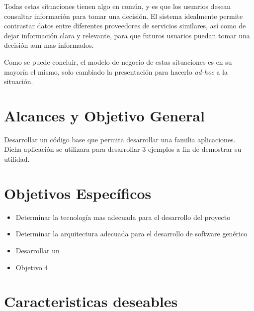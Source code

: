 Todas estas situaciones tienen algo en común, y es que los usuarios desean consultar información para tomar una decisión. El sistema idealmente permite contrastar datos entre diferentes proveedores de servicios similares, así como de dejar información clara y relevante, para que futuros usuarios puedan tomar una decisión aun mas informados.

Como se puede concluir, el modelo de negocio de estas situaciones es en su mayoría el mismo, solo cambiado la presentación para hacerlo \textit{ad-hoc} a la situación.

\section{Alcances y Objetivo General}\label{cap:intro:alcances}
Desarrollar un código base que permita desarrollar una familia aplicaciones. Dicha aplicación se utilizara para desarrollar 3 ejemplos a fin de demostrar su utilidad.

\section{Objetivos Específicos}\label{cap:intro:objetivos}
\begin{itemize}
	\item Determinar la tecnología mas adecuada para el desarrollo del proyecto
	\item Determinar la arquitectura adecuada para el desarrollo de software genérico
	\item Desarrollar un \ecommerce
	\item Objetivo 4
\end{itemize}

\section{Caracteristicas deseables}\label{cap:intro:alcance}

